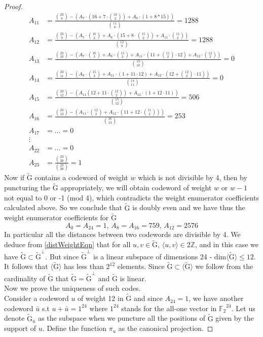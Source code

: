 \documentclass[12pt]{article}
\theoremstyle{definition}
\numberwithin{equation}{theorem}
\numberwithin{figure}{theorem}
\newcommand{\cCodes}{\ensuremath{\widetilde{\mathrm{G}}}}
\newcommand{\cCodesVertical}{\cCodes^{\bot}}
\newcommand{\ftwoN}[1]{\ensuremath{\mathbb{F}_2}^{#1}}
\newcommand{\Integer}{\ensuremath{\mathbb{Z}}}
\begin{document}
\begin{proof}
\begin{align*}
		A_{11} &= \frac{\binom{23}{8} - (A_7\cdot(16 + 7\cdot \binom{16}{2}) + A_8\cdot(1 + 8 * 15))}{\binom{11}{8}} = 1288\\
		A_{12} &= \frac{\binom{23}{9} - (A_7\cdot\binom{16}{2} + A_8\cdot(15 + 8 \cdot \binom{15}{2}) + A_{11}\cdot\binom{11}{2})}{\binom{12}{9}} = 1288 \\
		A_{13} &= \frac{\binom{23}{10} - (A_7\cdot\binom{16}{3} + A_8 \cdot \binom{15}{2} + A_{11} \cdot(11 + \binom{11}{2} \cdot 12) + A_{12} \cdot \binom{12}{2})}{\binom{13}{10}} = 0\\
		A_{14} &= \frac{\binom{23}{11} - (A_8 \cdot \binom{15}{3} + A_{11} \cdot(1 + 11 \cdot 12) + A_{12} \cdot(12 + \binom{12}{2} \cdot 11))}{\binom{14}{11}} = 0\\
		A_{15} &= \frac{\binom{23}{12} - (A_{11}(12 + 11 \cdot \binom{12}{2}) + A_{12}\cdot(1 + 12\cdot 11))}{\binom{15}{12}} = 506 \\
		A_{16} &= \frac{\binom{23}{13} - (A_{11} \cdot \binom{12}{2} + A_{12}\cdot(11 + 12 \cdot\binom{11}{2}))}{\binom{16}{13}} = 253\\
		A_{17} &= \ldots = 0 \\
		\vdots\\
		A_{22} &= \ldots = 0\\
		A_{23} &= \frac{\binom{23}{20}}{\binom{23}{20}} = 1
	\end{align*}
Now if {\cCodes} contains a codeword of weight $w$ which is not divisible by 4, then by puncturing the {\cCodes} appropriately, we will obtain codeword of weight $w$ or $w - 1$ not equal to 0 or -1 (mod 4), which contradicts the weight enumerator coefficients calculated above. So we conclude that {\cCodes} is doubly even and we have thus the weight enumerator coefficients for {\cCodes}
\[
	A_0 = A_{24} = 1, \, A_{8} = A_{16} = 759,\, A_{12} = 2576
\]
In particular all the distances between two codewords are divisible by 4. We deduce from \ref{distWeightEqn} that for all
$u,v \in \cCodes$, $\langle u, v\rangle \in 2\Integer$, and in this case we have $\cCodes \subset \cCodesVertical$. But since $\cCodesVertical$ is a linear subspace of dimensions 24 - dim$\langle \cCodes \rangle \leq 12$. It follows that $\langle \cCodes \rangle$ has less than $2^{12}$ elements. Since $\cCodes \subset \langle \cCodes \rangle$ we follow from the cardinality of $\cCodes$ that $\cCodes = \cCodesVertical$ and $\cCodes$ is linear.\\
Now we prove the uniqueness of such codes. \\
Consider a codeword $u$ of weight 12 in {\cCodes} and since $A_{24} = 1$, we have another codeword $\bar{u}$ s.t $u + \bar{u} = 1^{24}$ where $1^{24}$ stands for the all-one vector in $\ftwoN{24}$. Let us denote $\cCodes_u$ as the subspace when we puncture all the positions of $\cCodes$ given by the support of $u$. Define the function $\pi_{u}$ as the canonical projection.

\end{proof}
\end{document}
